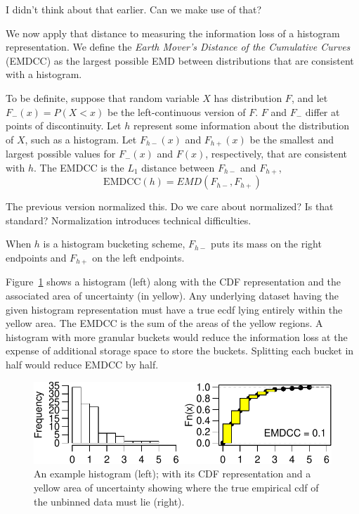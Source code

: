 \documentclass{article}
\newcommand{\Question}[1]{{\color{red}{\bf Question:} #1}}
\newcommand{\Fmin}{F_{h-}}
\newcommand{\Fmax}{F_{h+}}
\begin{document}
\Question{I didn't think about that earlier. Can we make use of that?}

We now apply that distance to measuring the information loss of a histogram
representation.
We define the
\emph{Earth Mover's Distance of the Cumulative Curves} (EMDCC)
as the largest possible EMD between distributions that are consistent
with a histogram.

To be definite,
suppose that random variable $X$ has
distribution $F$, and let
$F_{-}(x) = P(X < x)$ be the left-continuous version of $F$.
$F$ and $F_{-}$ differ at points of discontinuity.
Let $h$ represent some information about the distribution of $X$,
such as a histogram.
Let $\Fmin(x)$ and $\Fmax(x)$ be the smallest and largest possible values
for $F_{-}(x)$ and $F(x)$, respectively, that are consistent with $h$.
The EMDCC is the $L_1$ distance between $\Fmin$ and $\Fmax$,
\begin{equation}
  \mbox{EMDCC}(h)
  = EMD(\Fmin, \Fmax)
\end{equation}


\Question{The previous version normalized this.
Do we care about normalized? Is that standard?
Normalization introduces technical difficulties.
}

When $h$ is a histogram bucketing scheme,
$\Fmin$ puts its mass on the right endpoints and
$\Fmax$ on the left endpoints.

Figure~\ref{fig:emdcc} shows a histogram (left) along with the CDF representation and the
associated area of uncertainty (in yellow).  Any underlying dataset
having the given histogram representation must have a true ecdf lying
entirely within the yellow area.
The EMDCC is the sum of the areas of the yellow regions.
A histogram with more granular
buckets would reduce the information loss at the expense of additional
storage space to store the buckets.
Splitting each bucket in half would reduce EMDCC by half.

\begin{figure}[h!]
\centering
\includegraphics[width=\linewidth]{exhists-crop.pdf}
\caption{An example histogram (left);
 with its CDF representation and a
  yellow area of uncertainty showing where the true empirical cdf of
  the unbinned data must lie (right).}
\label{fig:emdcc}
\end{figure}
\end{document}
